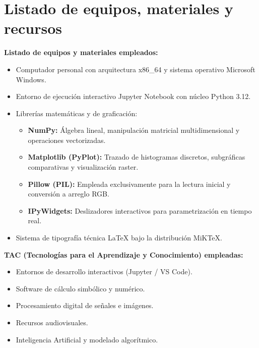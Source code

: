 \documentclass[12pt,a4paper]{article}
\newcommand{\checkedbox}{\boxtimes}
\begin{document}
\section{Listado de equipos, materiales y recursos}

\textbf{Listado de equipos y materiales empleados:}

\begin{itemize}
    \item Computador personal con arquitectura x86\_64 y sistema operativo Microsoft Windows.
    \item Entorno de ejecución interactivo Jupyter Notebook con núcleo Python 3.12.
    \item Librerías matemáticas y de graficación:
    \begin{itemize}
        \item \textbf{NumPy:} Álgebra lineal, manipulación matricial multidimensional y operaciones vectorizadas.
        \item \textbf{Matplotlib (PyPlot):} Trazado de histogramas discretos, subgráficas comparativas y visualización raster.
        \item \textbf{Pillow (PIL):} Empleada exclusivamente para la lectura inicial y conversión a arreglo RGB.
        \item \textbf{IPyWidgets:} Deslizadores interactivos para parametrización en tiempo real.
    \end{itemize}
    \item Sistema de tipografía técnica \LaTeX{} bajo la distribución MiKTeX.
\end{itemize}

\textbf{TAC (Tecnologías para el Aprendizaje y Conocimiento) empleadas:}

\begin{itemize}
    \item[$\checkedbox$] Entornos de desarrollo interactivos (Jupyter / VS Code).
    \item[$\checkedbox$] Software de cálculo simbólico y numérico.
    \item[$\checkedbox$] Procesamiento digital de señales e imágenes.
    \item[$\square$] Recursos audiovisuales.
    \item[$\checkedbox$] Inteligencia Artificial y modelado algorítmico.
\end{itemize}
\end{document}
